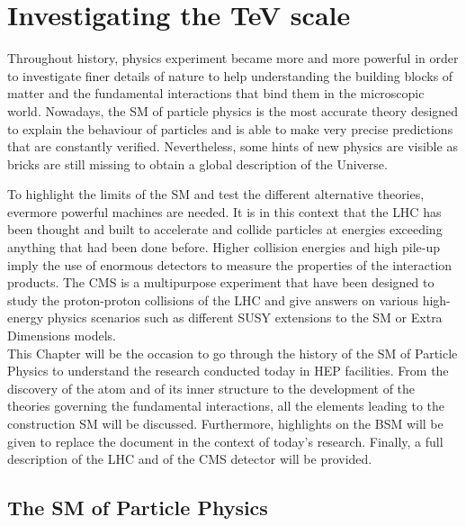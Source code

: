 \renewcommand\evenpagerightmark{{\scshape\small Chapter 2}}
\renewcommand\oddpageleftmark{{\scshape\small Investigating the \si{TeV} scale}}

\renewcommand{\bibname}{References}

\hyphenation{}

\chapter[Investigating the \si{TeV} scale]%
{Investigating the \si{TeV} scale}
\label{chapt:2}

	Throughout history, physics experiment became more and more powerful in order to investigate finer details of nature to help understanding the building blocks of matter and the fundamental interactions that bind them in the microscopic world. Nowadays, the \acl{SM} of particle physics is the most accurate theory designed to explain the behaviour of particles and is able to make very precise predictions that are constantly verified. Nevertheless, some hints of new physics are visible as bricks are still missing to obtain a global description of the Universe.
	
	To highlight the limits of the SM and test the different alternative theories, evermore powerful machines are needed. It is in this context that the \acl{LHC} has been thought and built to accelerate and collide particles at energies exceeding anything that had been done before. Higher collision energies and high pile-up imply the use of enormous detectors to measure the properties of the interaction products. The \acl{CMS} is a multipurpose experiment that have been designed to study the proton-proton collisions of the LHC and give answers on various high-energy physics scenarios such as different \acf{SUSY} extensions to the \acl{SM} or Extra Dimensions models.\\
	
	This Chapter will be the occasion to go through the history of the \acl{SM} of Particle Physics to understand the research conducted today in \acf{HEP} facilities. From the discovery of the atom and of its inner structure to the development of the theories governing the fundamental interactions, all the elements leading to the construction SM will be discussed. Furthermore, highlights on the \acf{BSM} will be given to replace the document in the context of today's research.  Finally, a full description of the LHC and of the CMS detector will be provided.

\section{The \acl{SM} of Particle Physics}
\label{chapt2:sec:SM}

